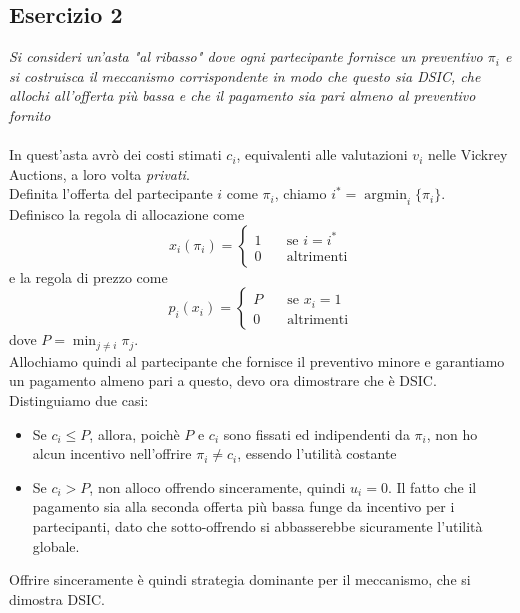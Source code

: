 \documentclass{article}
\DeclareMathOperator*{\argmin}{argmin}
\begin{document}
        \subsection{Esercizio 2}
            \textit{Si consideri un'asta "al ribasso" dove ogni partecipante fornisce un preventivo $ \pi_i $ e si costruisca il meccanismo corrispondente in modo che questo sia DSIC, che allochi all'offerta più bassa e che il pagamento sia pari almeno al preventivo fornito}\\
            \\
            In quest'asta avrò dei costi stimati $ c_i $, equivalenti alle valutazioni $ v_i $ nelle Vickrey Auctions, a loro volta \textit{privati}.\\
            Definita l'offerta del partecipante $ i $ come $ \pi_i $, chiamo $ i^* = \argmin_{i}\{\pi_i\} $.\\
            Definisco la regola di allocazione come 
            \[
                x_i(\pi_i) = \begin{cases}
                    1\quad &\text{se } i = i^*\\
                    0\quad &\text{altrimenti}
                \end{cases}    
            \]
            e la regola di prezzo come
            \[
                p_i(x_i) = \begin{cases}
                    P\quad &\text{se } x_i = 1\\
                    0\quad &\text{altrimenti}
                \end{cases}    
            \]
            dove $ P = \min_{j \neq i} \pi_j $.\\
            Allochiamo quindi al partecipante che fornisce il preventivo minore e garantiamo un pagamento almeno pari a questo, devo ora dimostrare che è DSIC.\\
            Distinguiamo due casi:
            \begin{itemize}
                \item Se $ c_i \leq P $, allora, poichè $ P $ e $ c_i $ sono fissati ed indipendenti da $ \pi_i $, non ho alcun incentivo nell'offrire $ \pi_i \neq c_i $, essendo l'utilità costante
                \item Se $ c_i > P $, non alloco offrendo sinceramente, quindi $ u_i = 0 $. Il fatto che il pagamento sia alla seconda offerta più bassa funge da incentivo per i partecipanti, dato che sotto-offrendo si abbasserebbe sicuramente l'utilità globale.
            \end{itemize}
            Offrire sinceramente è quindi strategia dominante per il meccanismo, che si dimostra DSIC.
        \newpage
\end{document}
